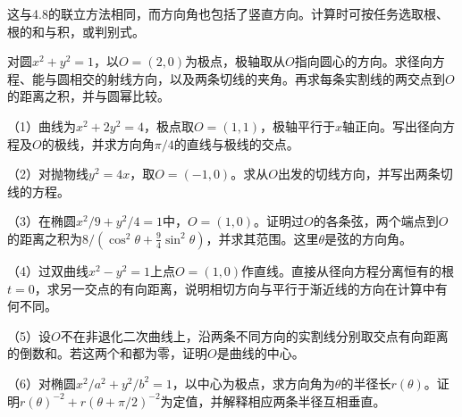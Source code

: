 这与4.8的联立方法相同，而方向角也包括了竖直方向。计算时可按任务选取根、根的和与积，或判别式。

\par\addvspace{6pt}\noindent\begin{minipage}{\linewidth}
\begin{example}
对圆\(x^2+y^2=1\)，以\(O=(2,0)\)为极点，极轴取从\(O\)指向圆心的方向。求径向方程、能与圆相交的射线方向，以及两条切线的夹角。再求每条实割线的两交点到\(O\)的距离之积，并与圆幂比较。
\end{example}
\end{minipage}\par\addvspace{6pt}

\begin{exercise}
\mbox{}\par\nobreak
\begin{samepage}
（1）曲线为\(x^2+2y^2=4\)，极点取\(O=(1,1)\)，极轴平行于\(x\)轴正向。写出径向方程及\(O\)的极线，并求方向角\(\pi/4\)的直线与极线的交点。
\par\end{samepage}
\begin{samepage}
（2）对抛物线\(y^2=4x\)，取\(O=(-1,0)\)。求从\(O\)出发的切线方向，并写出两条切线的方程。
\par\end{samepage}
\begin{samepage}
（3）在椭圆\(x^2/9+y^2/4=1\)中，\(O=(1,0)\)。证明过\(O\)的各条弦，两个端点到\(O\)的距离之积为\(8/(\cos^2\theta+\tfrac94\sin^2\theta)\)，并求其范围。这里\(\theta\)是弦的方向角。
\par\end{samepage}
\begin{samepage}
（4）过双曲线\(x^2-y^2=1\)上点\(O=(1,0)\)作直线。直接从径向方程分离恒有的根\(t=0\)，求另一交点的有向距离，说明相切方向与平行于渐近线的方向在计算中有何不同。
\par\end{samepage}
\begin{samepage}
（5）设\(O\)不在非退化二次曲线上，沿两条不同方向的实割线分别取交点有向距离的倒数和。若这两个和都为零，证明\(O\)是曲线的中心。
\par\end{samepage}
\begin{samepage}
（6）对椭圆\(x^2/a^2+y^2/b^2=1\)，以中心为极点，求方向角为\(\theta\)的半径长\(r(\theta)\)。证明\(r(\theta)^{-2}+r(\theta+\pi/2)^{-2}\)为定值，并解释相应两条半径互相垂直。
\par\end{samepage}
\end{exercise}

